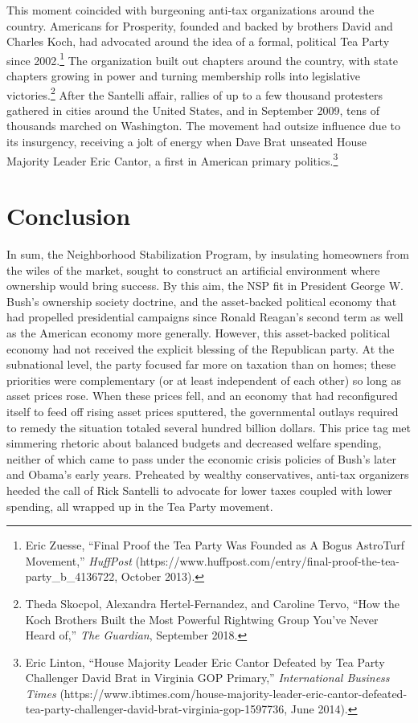 \documentclass[12pt,oneside]{psthesis}
\begin{document}
This moment coincided with burgeoning anti-tax organizations around the country.
Americans for Prosperity, founded and backed by brothers David and Charles Koch, had advocated around the idea of a formal, political Tea Party since 2002.\footnote{Eric Zuesse, ``Final Proof the Tea Party Was Founded as A Bogus AstroTurf Movement,'' \emph{HuffPost} (https://www.huffpost.com/entry/final-proof-the-tea-party\_b\_4136722, October 2013).}
The organization built out chapters around the country, with state chapters growing in power and turning membership rolls into legislative victories.\footnote{Theda Skocpol, Alexandra Hertel-Fernandez, and Caroline Tervo, ``How the Koch Brothers Built the Most Powerful Rightwing Group You've Never Heard of,'' \emph{The Guardian}, September 2018.}
After the Santelli affair, rallies of up to a few thousand protesters gathered in cities around the United States, and in September 2009, tens of thousands marched on Washington.
The movement had outsize influence due to its insurgency, receiving a jolt of energy when Dave Brat unseated House Majority Leader Eric Cantor, a first in American primary politics.\footnote{Eric Linton, ``House Majority Leader Eric Cantor Defeated by Tea Party Challenger David Brat in Virginia GOP Primary,'' \emph{International Business Times} (https://www.ibtimes.com/house-majority-leader-eric-cantor-defeated-tea-party-challenger-david-brat-virginia-gop-1597736, June 2014).}

\hypertarget{conclusion}{%
\section{Conclusion}\label{conclusion}}

In sum, the Neighborhood Stabilization Program, by insulating homeowners from the wiles of the market, sought to construct an artificial environment where ownership would bring success.
By this aim, the NSP fit in President George W. Bush's ownership society doctrine, and the asset-backed political economy that had propelled presidential campaigns since Ronald Reagan's second term as well as the American economy more generally.
However, this asset-backed political economy had not received the explicit blessing of the Republican party.
At the subnational level, the party focused far more on taxation than on homes; these priorities were complementary (or at least independent of each other) so long as asset prices rose.
When these prices fell, and an economy that had reconfigured itself to feed off rising asset prices sputtered, the governmental outlays required to remedy the situation totaled several hundred billion dollars.
This price tag met simmering rhetoric about balanced budgets and decreased welfare spending, neither of which came to pass under the economic crisis policies of Bush's later and Obama's early years.
Preheated by wealthy conservatives, anti-tax organizers heeded the call of Rick Santelli to advocate for lower taxes coupled with lower spending, all wrapped up in the Tea Party movement.
\end{document}
